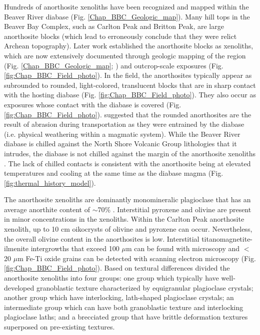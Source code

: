Hundreds of anorthosite xenoliths have been recognized and mapped within the Beaver River diabase (Fig. \ref{Chap_BBC_Geologic_map}). Many hill tops in the Beaver Bay Complex, such as Carlton Peak and Britton Peak, are large anorthosite blocks (which lead \cite{Lawson1893a} to erroneously conclude that they were relict Archean topography). Later work established the anorthosite blocks as xenoliths, which are now extensively documented through geologic mapping of the region (Fig. \ref{Chap_BBC_Geologic_map}; \cite{Miller2001a, Miller1988a, Miller1989a, Boerboom2004a, Boerboom2006a, Boerboom2006b, Boerboom2007a}) and outcrop-scale exposures (Fig. \ref{fig:Chap_BBC_Field_photo}). In the field, the anorthosites typically appear as subrounded to rounded, light-colored, translucent blocks that are in sharp contact with the hosting diabase (Fig. \ref{fig:Chap_BBC_Field_photo}). They also occur as exposures whose contact with the diabase is covered (Fig. \ref{fig:Chap_BBC_Field_photo}). \cite{Grout1939a} suggested that the rounded anorthosites are the result of abrasion during transportation as they were entrained by the diabase (i.e. physical weathering within a magmatic system). While the Beaver River diabase is chilled against the North Shore Volcanic Group lithologies that it intrudes, the diabase is not chilled against the margin of the anorthosite xenoliths \citep{Morrison1983a, Miller1997a}. The lack of chilled contacts is consistent with the anorthosite being at elevated temperatures and cooling at the same time as the diabase magma (Fig. \ref{fig:thermal_history_model}).

The anorthosite xenoliths are dominantly monomineralic plagioclase that has an average anorthite content of $\sim$70\% \citep{Morrison1983a, Doyle2016a}. Interstitial pyroxene and olivine are present in minor concentrations in the xenoliths. Within the Carlton Peak anorthosite xenolith, up to 10 cm oikocrysts of olivine and pyroxene can occur. Nevertheless, the overall olivine content in the anorthosites is low. Interstitial titanomagnetite-ilmenite intergrowths that exceed 100 $\mu$m can be found with microscopy and $<$20 $\mu$m Fe-Ti oxide grains can be detected with scanning electron microscopy (Fig. \ref{fig:Chap_BBC_Field_photo}). Based on textural differences \cite{Morrison1983a} divided the anorthosite xenoliths into four groups: one group which typically have well-developed granoblastic texture characterized by equigranular plagioclase crystals; another group which have interlocking, lath-shaped plagioclase crystals; an intermediate group which can have both granoblastic texture and interlocking plagioclase laths; and a brecciated group that have brittle deformation textures superposed on pre-existing textures. 

